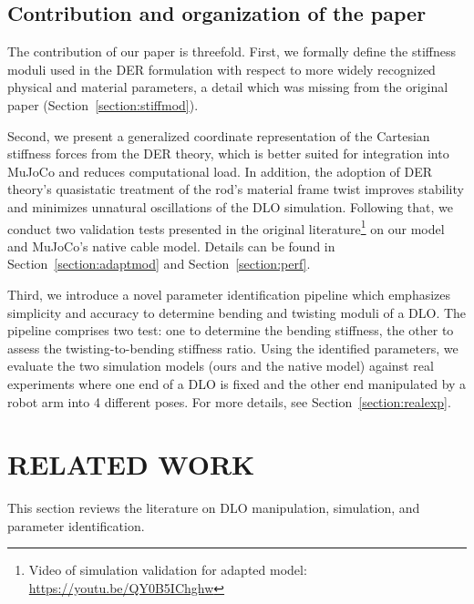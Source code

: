 \documentclass[letterpaper, 10 pt, conference]{ieeeconf}  %
\begin{document}
\subsection*{Contribution and organization of the paper}

The contribution of our paper is threefold. First, we formally define the stiffness moduli used in the DER formulation with respect to more widely recognized physical and material parameters, a detail which was missing from the original paper \cite{bergou2008discrete} (Section~\ref{section:stiffmod}).

Second, we present a generalized coordinate representation of the Cartesian stiffness forces from the DER theory, which is better suited for integration into MuJoCo and reduces computational load. In addition, the adoption of DER theory's quasistatic treatment of the rod's material frame twist improves stability and minimizes unnatural oscillations of the DLO simulation. Following that, we conduct two validation tests presented in the original literature\footnote{Video of simulation validation for adapted model: \url{https://youtu.be/QY0B5IChghw}} \cite{bergou2008discrete} on our model and MuJoCo's native cable model. Details can be found in Section~\ref{section:adaptmod} and Section~\ref{section:perf}.

Third, we introduce a novel parameter identification pipeline which emphasizes simplicity and accuracy to determine bending and twisting moduli of a DLO. The pipeline comprises two test: one to determine the bending stiffness, the other to assess the twisting-to-bending stiffness ratio. Using the identified parameters, we evaluate the two simulation models (ours and the native model) against real experiments where one end of a DLO is fixed and the other end manipulated by a robot arm into 4 different poses. For more details, see Section~\ref{section:realexp}.



\section{RELATED WORK}
This section reviews the literature on DLO manipulation, simulation, and parameter identification.
\end{document}
